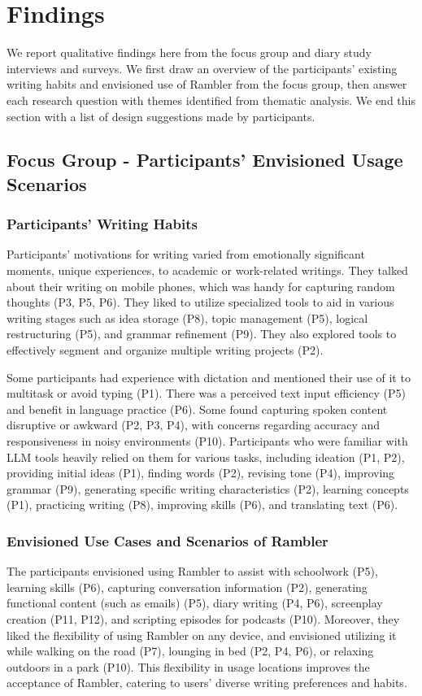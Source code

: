 \section{Findings}
We report qualitative findings here from the focus group and diary study interviews and surveys. We first draw an overview of the participants' existing writing habits and envisioned use of Rambler from the focus group, then answer each research question with themes identified from thematic analysis. We end this section with a list of design suggestions made by participants.
\subsection{Focus Group - Participants' Envisioned Usage Scenarios}
\subsubsection{Participants' Writing Habits}
Participants' motivations for writing varied from emotionally significant moments, unique experiences, to academic or work-related writings. They talked about their writing on mobile phones, which was handy for capturing random thoughts (P3, P5, P6). They liked to utilize specialized tools to aid in various writing stages such as idea storage (P8), topic management (P5), logical restructuring (P5), and grammar refinement (P9). They also explored tools to effectively segment and organize multiple writing projects (P2).

Some participants had experience with dictation and mentioned their use of it to multitask or avoid typing (P1). There was a perceived text input efficiency (P5) and benefit in language practice (P6). Some found capturing spoken content disruptive or awkward (P2, P3, P4), with concerns regarding accuracy and responsiveness in noisy environments (P10). Participants who were familiar with LLM tools heavily relied on them for various tasks, including ideation (P1, P2), providing initial ideas (P1), finding words (P2), revising tone (P4), improving grammar (P9), generating specific writing characteristics (P2), learning concepts (P1), practicing writing (P8), improving skills (P6), and translating text (P6).

\subsubsection{Envisioned Use Cases and Scenarios of Rambler}

The participants envisioned using Rambler to assist with schoolwork (P5), learning skills (P6), capturing conversation information (P2), generating functional content (such as emails) (P5), diary writing (P4, P6), screenplay creation (P11, P12), and scripting episodes for podcasts (P10).
Moreover, they liked the flexibility of using Rambler on any device, and envisioned utilizing it while walking on the road (P7), lounging in bed (P2, P4, P6), or relaxing outdoors in a park (P10). This flexibility in usage locations improves the acceptance of Rambler, catering to users' diverse writing preferences and habits.

